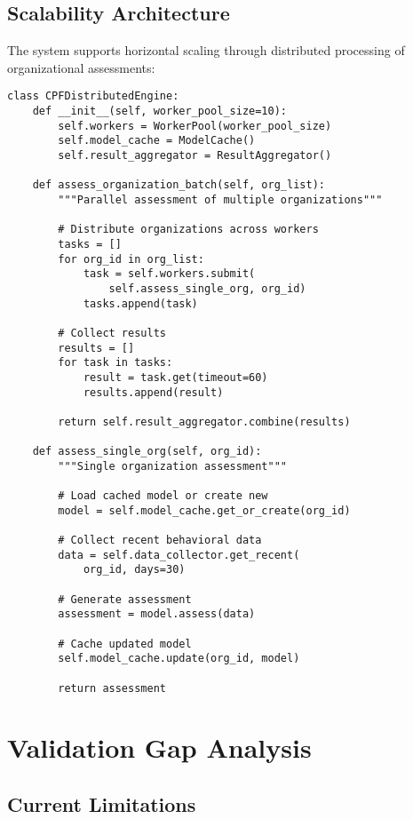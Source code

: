 \documentclass[10pt,twocolumn]{IEEEtran}
\begin{document}
\subsection{Scalability Architecture}

The system supports horizontal scaling through distributed processing of organizational assessments:

\begin{lstlisting}[caption={Distributed Processing Architecture},label={lst:distributed}]
class CPFDistributedEngine:
    def __init__(self, worker_pool_size=10):
        self.workers = WorkerPool(worker_pool_size)
        self.model_cache = ModelCache()
        self.result_aggregator = ResultAggregator()
        
    def assess_organization_batch(self, org_list):
        """Parallel assessment of multiple organizations"""
        
        # Distribute organizations across workers
        tasks = []
        for org_id in org_list:
            task = self.workers.submit(
                self.assess_single_org, org_id)
            tasks.append(task)
        
        # Collect results
        results = []
        for task in tasks:
            result = task.get(timeout=60)
            results.append(result)
        
        return self.result_aggregator.combine(results)
    
    def assess_single_org(self, org_id):
        """Single organization assessment"""
        
        # Load cached model or create new
        model = self.model_cache.get_or_create(org_id)
        
        # Collect recent behavioral data
        data = self.data_collector.get_recent(
            org_id, days=30)
        
        # Generate assessment
        assessment = model.assess(data)
        
        # Cache updated model
        self.model_cache.update(org_id, model)
        
        return assessment
\end{lstlisting}

\section{Validation Gap Analysis}

\subsection{Current Limitations}
\end{document}
